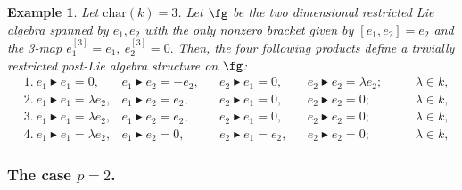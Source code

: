 \documentclass[12pt]{article}
\newcommand{\black}{\color{black}}
\newcommand{\btr}{\blacktriangleright}
\newtheorem{example}[theorem]{Example}
\begin{document}



\begin{example}
    Let $\text{char}(k)=3$. Let $\fg$ be the two dimensional restricted Lie algebra spanned by $e_1,e_2$ with the only nonzero bracket given by $[e_1,e_2]=e_2$ and the 3-map $e_1^{[3]}=e_1,~e_2^{[3]}=0.$ Then, the four following products define a trivially restricted post-Lie algebra structure on $\fg$:
    \begin{align}
        &1.~e_1\btr e_1=0,&e_1\btr e_2=-e_2,&&e_2\btr e_1=0,&& e_2\btr e_2=\lambda e_2;\quad && \lambda\in k, \\
        &2.~e_1\btr e_1=\lambda e_2,&e_1\btr e_2= e_2,&&e_2\btr e_1=0,&&e_2\btr e_2=0;\quad && \lambda\in k, \\
        &3.~e_1\btr e_1=\lambda e_2,&e_1\btr e_2=e_2,&&e_2\btr e_1=0,&&e_2\btr e_2=0;\quad && \lambda\in k, \\
        &4.~e_1\btr e_1=\lambda e_2,&e_1\btr e_2= 0,&&e_2\btr e_1=e_2,&&e_2\btr e_2=0;\quad && \lambda\in k,
    \end{align}
\end{example}




\subsubsection{The case $p=2$.}\label{sec:p=2}
\end{document}
